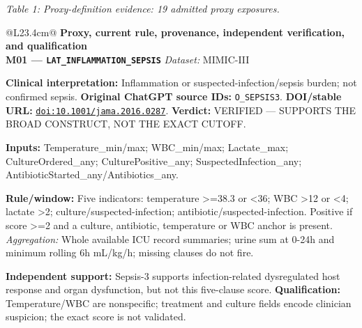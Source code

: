 \begin{center}\textit{Table 1: Proxy-definition evidence: 19 admitted proxy exposures.}\end{center}
\begin{tabular}{@{}L{23.4cm}@{}}
\toprule
\textbf{Proxy, current rule, provenance, independent verification, and qualification}\\
\midrule
\textbf{M01 --- \nolinkurl{LAT_INFLAMMATION_SEPSIS}} \hfill \textit{Dataset:} MIMIC-III\par\textbf{Clinical interpretation:} Inflammation or suspected-infection/sepsis burden; not confirmed sepsis. \textbf{Original ChatGPT source IDs:} \nolinkurl{O_SEPSIS3}. \textbf{DOI/stable URL:} \href{https://doi.org/10.1001/jama.2016.0287}{\nolinkurl{doi:10.1001/jama.2016.0287}}. \textbf{Verdict:} VERIFIED --- SUPPORTS THE BROAD CONSTRUCT, NOT THE EXACT CUTOFF.\par\textbf{Inputs:} Temperature\_min/max; WBC\_min/max; Lactate\_max; CultureOrdered\_any; CulturePositive\_any; SuspectedInfection\_any; AntibioticStarted\_any/Antibiotics\_any.\par\textbf{Rule/window:} Five indicators: temperature >=38.3 or <36; WBC >12 or <4; lactate >2; culture/suspected-infection; antibiotic/suspected-infection. Positive if score >=2 and a culture, antibiotic, temperature or WBC anchor is present. \textit{Aggregation:} Whole available ICU record summaries; urine sum at 0-24h and minimum rolling 6h mL/kg/h; missing clauses do not fire.\par\textbf{Independent support:} Sepsis-3 supports infection-related dysregulated host response and organ dysfunction, but not this five-clause score. \textbf{Qualification:} Temperature/WBC are nonspecific; treatment and culture fields encode clinician suspicion; the exact score is not validated. \\
\addlinespace[3pt]
\midrule

\end{tabular}
